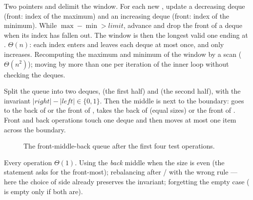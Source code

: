 \idea Two pointers  and  delimit the window. For each new ,
update a decreasing deque (front: index of the maximum) and an increasing deque (front:
index of the minimum). While $\max-\min>\mathit{limit}$, advance  and drop the
front of a deque when its index has fallen out. The window is then the longest valid one
ending at .
\complexity $\Theta(n)$: each index enters and leaves each deque at most once, and
 only increases.
\mistakes Recomputing the maximum and minimum of the window by a scan ($\Theta(n^2)$);
moving  by more than one per iteration of the inner loop without checking the
deques.

\idea Split the queue into two deques,  (the first half) and  (the
second half), with the invariant $|\mathit{right}|-|\mathit{left}|\in\{0,1\}$. Then the
middle is next to the boundary:  goes to the back of  or the
front of ,  takes the back of  (equal sizes) or the front
of . Front and back operations touch one deque and then  moves at
most one item across the boundary.

\begin{figure}[ht]\centering
{}
\caption{The front-middle-back queue after the first four test operations.}
\end{figure}

\complexity Every operation $\Theta(1)$.
\mistakes Using the \emph{back} middle when the size is even (the statement asks for the
front-most); rebalancing after / with the wrong rule ---
here the choice of side already preserves the invariant; forgetting the empty case
( is empty only if both are).

